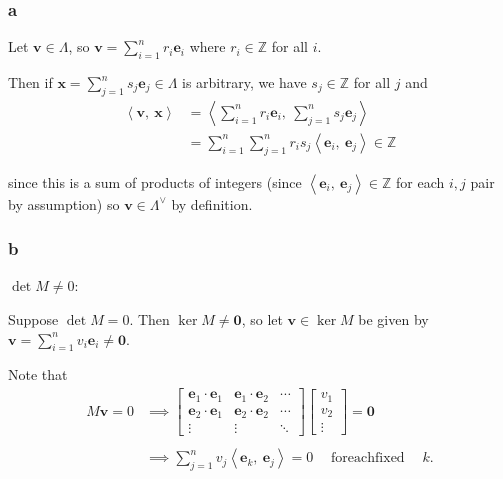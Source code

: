 \begin{solution}

\hypertarget{a-104}{%
\subsubsection{a}\label{a-104}}

Let \(\mathbf{v} \in \Lambda\), so
\(\mathbf{v} = \sum_{i=1}^n r_i \mathbf{e}_i\) where
\(r_i \in {\mathbb{Z}}\) for all \(i\).

Then if \(\mathbf{x} = \sum_{j=1}^n s_j \mathbf{e}_j \in \Lambda\) is
arbitrary, we have \(s_j \in {\mathbb{Z}}\) for all \(j\) and
\begin{align*}
{\left\langle {\mathbf{v}},~{\mathbf{x}} \right\rangle} 
&= {\left\langle {\sum_{i=1}^n r_i \mathbf{e}_i},~{\sum_{j=1}^n s_j \mathbf{e}_j } \right\rangle} \\
&= \sum_{i=1}^n \sum_{j=1}^n r_i s_j {\left\langle {\mathbf{e}_i},~{\mathbf{e}_j } \right\rangle}  \in {\mathbb{Z}}
\end{align*}

since this is a sum of products of integers (since
\({\left\langle {\mathbf{e}_i},~{\mathbf{e}_j} \right\rangle} \in {\mathbb{Z}}\)
for each \(i, j\) pair by assumption) so \(\mathbf{v} \in \Lambda^\vee\)
by definition.

\hypertarget{b-94}{%
\subsubsection{b}\label{b-94}}

\textbf{\(\det M \neq 0\)}:

Suppose \(\det M = 0\). Then \(\ker M \neq \mathbf{0}\), so let
\(\mathbf{v} \in \ker M\) be given by
\(\mathbf{v} = \sum_{i=1}^n v_i \mathbf{e}_i \neq \mathbf{0}\).

Note that
\begin{align*}
M\mathbf{v} = 0 &\implies
\left[
\begin{array}{ccc}
\mathbf{e}_1 \cdot \mathbf{e}_1 & \mathbf{e}_1 \cdot \mathbf{e}_2 & \cdots \\
\mathbf{e}_2 \cdot \mathbf{e}_1 & \mathbf{e}_2 \cdot \mathbf{e}_2 & \cdots \\
\vdots & \vdots & \ddots
\end{array}
\right]
\left[\begin{array}{c}
v_1 \\ v_2 \\ \vdots
\end{array}\right] = \mathbf{0} \\ \\
&\implies \sum_{j=1}^n v_j{\left\langle {\mathbf{e}_k},~{\mathbf{e}_j} \right\rangle} = 0 {\quad \operatorname{for each fixed} \quad} k
.\end{align*}


\end{solution}

